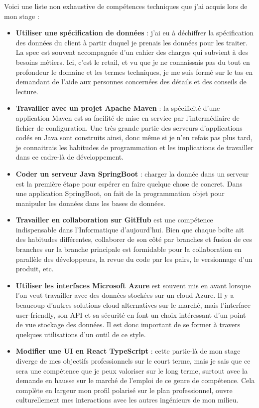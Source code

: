 \documentclass{rapportCS}
\begin{document}
Voici une liste non exhaustive de compétences techniques que j'ai acquis lors de mon stage :
\begin{itemize}
\item \textbf{Utiliser une spécification de données} : j'ai eu à déchiffrer la spécification
des données du client à partir duquel je prenais les données pour les traiter.
La spec est souvent accompagnée d'un cahier des charges qui subvient à des besoins
métiers. Ici, c'est le retail, et vu que je ne connaissais pas du tout en profondeur
le domaine et les termes techniques, je me suis formé sur le tas en demandant de
l'aide aux personnes concernées des détails et des conseils de lecture.
\item \textbf{Travailler avec un projet Apache Maven} : la spécificité d'une
application Maven est sa facilité de mise en service par l'intermédiaire de fichier de 
configuration. Une très grande partie des serveurs d'applications codés en Java
sont construits ainsi, donc même si je n'en refais pas plus tard, je connaitrais les
habitudes de programmation et les implications de travailler dans ce cadre-là de développement.
\item \textbf{Coder un serveur Java SpringBoot} : charger la donnée dans un serveur est la 
première étape pour espérer en faire quelque chose de concret. Dans une application SpringBoot,
on fait de la programmation objet pour manipuler les données dans les bases de données.
\item \textbf{Travailler en collaboration sur GitHub} est une compétence indispensable dans l'Informatique
d'aujourd'hui. Bien que chaque boîte ait des habitudes différentes, collaborer de son côté
par branches et fusion de ces branches sur la branche principale est formidable pour la
collaboration en parallèle des développeurs, la revue du code par les pairs, le versionnage
d'un produit, etc.
\item \textbf{Utiliser les interfaces Microsoft Azure} est souvent mis en avant 
lorsque l'on veut travailler avec des données stockées sur un cloud Azure.
Il y a beaucoup d'autres solutions cloud alternatives sur le marché, mais l'interface
user-friendly, son API et sa sécurité en font un choix intéressant d'un point de vue 
stockage des données. Il est donc important de se former à travers quelques utilisations
d'un outil de ce style.
\item \textbf{Modifier une UI en React TypeScript} : cette partie-là de mon stage
diverge de mes objectifs professionnels sur le court terme, mais je sais que ce sera 
une compétence que je peux valoriser sur le long terme, surtout avec la demande en hausse
sur le marché de l'emploi de ce genre de compétence. Cela complète en largeur mon 
profil polarisé sur le plan professionnel, ouvre culturellement mes interactions
avec les autres ingénieurs de mon milieu.
\end{itemize}
\end{document}
